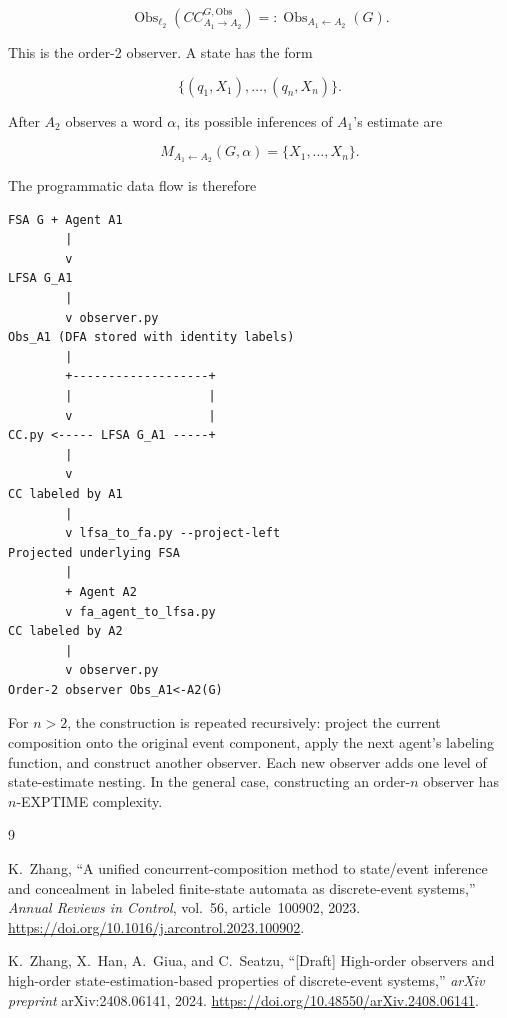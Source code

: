 \documentclass[11pt]{article}
\begin{document}
\begin{enumerate}
\[
   \operatorname{Obs}_{\ell_2}
   \left(CC^{G,\mathrm{Obs}}_{A_1\rightarrow A_2}\right)
   =:
   \operatorname{Obs}_{A_1\leftarrow A_2}(G).
\]

This is the order-2 observer. A state has the form

\[
   \{(q_1,X_1),\ldots,(q_n,X_n)\}.
\]

After $A_2$ observes a word $\alpha$, its possible inferences of
$A_1$'s estimate are

\[
   M_{A_1\leftarrow A_2}(G,\alpha)
   =\{X_1,\ldots,X_n\}.
\]

\end{enumerate}

The programmatic data flow is therefore

\begin{verbatim}
FSA G + Agent A1
        |
        v
LFSA G_A1
        |
        v observer.py
Obs_A1 (DFA stored with identity labels)
        |
        +-------------------+
        |                   |
        v                   |
CC.py <----- LFSA G_A1 -----+
        |
        v
CC labeled by A1
        |
        v lfsa_to_fa.py --project-left
Projected underlying FSA
        |
        + Agent A2
        v fa_agent_to_lfsa.py
CC labeled by A2
        |
        v observer.py
Order-2 observer Obs_A1<-A2(G)
\end{verbatim}


For $n>2$, the construction is repeated recursively: project the
current composition onto the original event component, apply the next
agent's labeling function, and construct another observer. Each new
observer adds one level of state-estimate nesting. In the general case,
constructing an order-$n$ observer has $n$-EXPTIME complexity.


\begin{thebibliography}{9}

K.~Zhang,
``A unified concurrent-composition method to state/event inference and concealment in labeled finite-state automata as discrete-event systems,''
\emph{Annual Reviews in Control},
vol.~56, article~100902, 2023.
\url{https://doi.org/10.1016/j.arcontrol.2023.100902}.

K.~Zhang, X.~Han, A.~Giua, and C.~Seatzu,
``[Draft] High-order observers and high-order state-estimation-based properties of discrete-event systems,''
\emph{arXiv preprint} arXiv:2408.06141, 2024.
\url{https://doi.org/10.48550/arXiv.2408.06141}.

\end{thebibliography}
\end{document}
